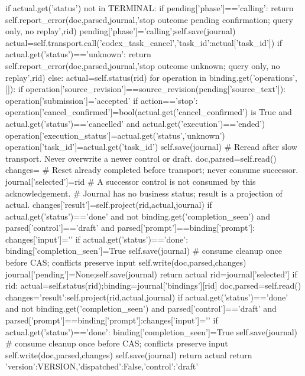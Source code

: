                     if actual.get('status') not in TERMINAL:
                        if pending['phase']=='calling':
                            return self.report_error(doc,parsed,journal,'stop outcome pending confirmation; query only, no replay',rid)
                        pending['phase']='calling';self.save(journal)
                        actual=self.transport.call('codex_task_cancel',{'task_id':actual['task_id']})
                    if actual.get('status')=='unknown':
                        return self.report_error(doc,parsed,journal,'stop outcome unknown; query only, no replay',rid)
                else: actual=self.status(rid)
                for operation in binding.get('operations',[]):
                    if operation['source_revision']==source_revision(pending['source_text']):
                        operation['submission']='accepted'
                        if action=='stop':
                            operation['cancel_confirmed']=bool(actual.get('cancel_confirmed') is True
                                and actual.get('status')=='cancelled' and actual.get('execution')=='ended')
                            operation['execution_status']=actual.get('status','unknown')
                            operation['task_id']=actual.get('task_id')
                self.save(journal)
                # Reread after slow transport. Never overwrite a newer control or draft.
                doc,parsed=self.read()
                changes={}
                # Reset already completed before transport; never consume successor.
                journal['selected']=rid
                # A successor control is not consumed by this acknowledgement.
                # Journal has no business status; result is a projection of actual.
                changes['result']=self.project(rid,actual,journal)
                if actual.get('status')=='done' and not binding.get('completion_seen') and parsed['control']=='draft' and parsed['prompt']==binding['prompt']:
                    changes['input']='\n'
                if actual.get('status')=='done':
                    binding['completion_seen']=True
                    self.save(journal)  # consume cleanup once before CAS; conflicts preserve input
                self.write(doc,parsed,changes)
                journal['pending']=None;self.save(journal)
                return actual
            rid=journal['selected']
            if rid:
                actual=self.status(rid);binding=journal['bindings'][rid]
                doc,parsed=self.read()
                changes={'result':self.project(rid,actual,journal)}
                if actual.get('status')=='done' and not binding.get('completion_seen') and parsed['control']=='draft' and parsed['prompt']==binding['prompt']:changes['input']='\n'
                if actual.get('status')=='done':
                    binding['completion_seen']=True
                    self.save(journal)  # consume cleanup once before CAS; conflicts preserve input
                self.write(doc,parsed,changes)
                self.save(journal)
                return actual
            return {'version':VERSION,'dispatched':False,'control':'draft'}

